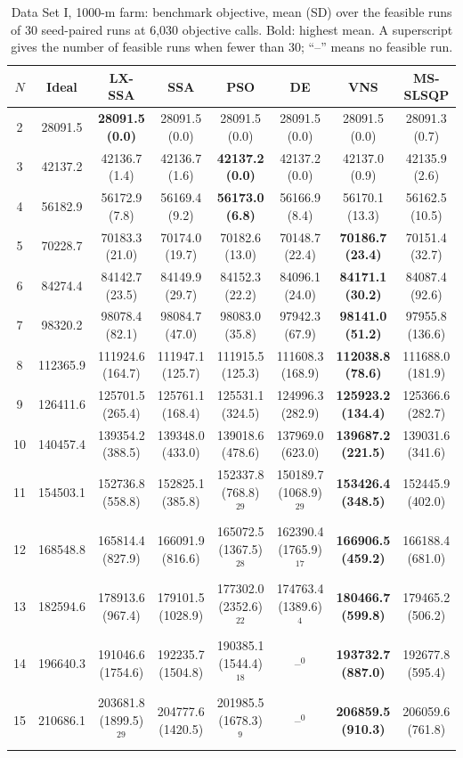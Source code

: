\begin{table}[!t]
\centering
\caption{Data Set I, 1000-m farm: benchmark objective, mean (SD) over the feasible runs of 30 seed-paired runs at 6,030 objective calls. Bold: highest mean. A superscript gives the number of feasible runs when fewer than 30; ``--'' means no feasible run.}
\label{tab:res-1-1000}
\scriptsize\setlength{\tabcolsep}{3pt}
\begin{tabular}{cccccccc}
\toprule
$N$ & Ideal & LX-SSA & SSA & PSO & DE & VNS & MS-SLSQP \\
\midrule
2 & 28091.5 & \textbf{28091.5 (0.0)} & 28091.5 (0.0) & 28091.5 (0.0) & 28091.5 (0.0) & 28091.5 (0.0) & 28091.3 (0.7) \\
3 & 42137.2 & 42136.7 (1.4) & 42136.7 (1.6) & \textbf{42137.2 (0.0)} & 42137.2 (0.0) & 42137.0 (0.9) & 42135.9 (2.6) \\
4 & 56182.9 & 56172.9 (7.8) & 56169.4 (9.2) & \textbf{56173.0 (6.8)} & 56166.9 (8.4) & 56170.1 (13.3) & 56162.5 (10.5) \\
5 & 70228.7 & 70183.3 (21.0) & 70174.0 (19.7) & 70182.6 (13.0) & 70148.7 (22.4) & \textbf{70186.7 (23.4)} & 70151.4 (32.7) \\
6 & 84274.4 & 84142.7 (23.5) & 84149.9 (29.7) & 84152.3 (22.2) & 84096.1 (24.0) & \textbf{84171.1 (30.2)} & 84087.4 (92.6) \\
7 & 98320.2 & 98078.4 (82.1) & 98084.7 (47.0) & 98083.0 (35.8) & 97942.3 (67.9) & \textbf{98141.0 (51.2)} & 97955.8 (136.6) \\
8 & 112365.9 & 111924.6 (164.7) & 111947.1 (125.7) & 111915.5 (125.3) & 111608.3 (168.9) & \textbf{112038.8 (78.6)} & 111688.0 (181.9) \\
9 & 126411.6 & 125701.5 (265.4) & 125761.1 (168.4) & 125531.1 (324.5) & 124996.3 (282.9) & \textbf{125923.2 (134.4)} & 125366.6 (282.7) \\
10 & 140457.4 & 139354.2 (388.5) & 139348.0 (433.0) & 139018.6 (478.6) & 137969.0 (623.0) & \textbf{139687.2 (221.5)} & 139031.6 (341.6) \\
11 & 154503.1 & 152736.8 (558.8) & 152825.1 (385.8) & 152337.8 (768.8)$^{29}$ & 150189.7 (1068.9)$^{29}$ & \textbf{153426.4 (348.5)} & 152445.9 (402.0) \\
12 & 168548.8 & 165814.4 (827.9) & 166091.9 (816.6) & 165072.5 (1367.5)$^{28}$ & 162390.4 (1765.9)$^{17}$ & \textbf{166906.5 (459.2)} & 166188.4 (681.0) \\
13 & 182594.6 & 178913.6 (967.4) & 179101.5 (1028.9) & 177302.0 (2352.6)$^{22}$ & 174763.4 (1389.6)$^{4}$ & \textbf{180466.7 (599.8)} & 179465.2 (506.2) \\
14 & 196640.3 & 191046.6 (1754.6) & 192235.7 (1504.8) & 190385.1 (1544.4)$^{18}$ & --$^{0}$ & \textbf{193732.7 (887.0)} & 192677.8 (595.4) \\
15 & 210686.1 & 203681.8 (1899.5)$^{29}$ & 204777.6 (1420.5) & 201985.5 (1678.3)$^{9}$ & --$^{0}$ & \textbf{206859.5 (910.3)} & 206059.6 (761.8) \\
\bottomrule
\end{tabular}
\end{table}

